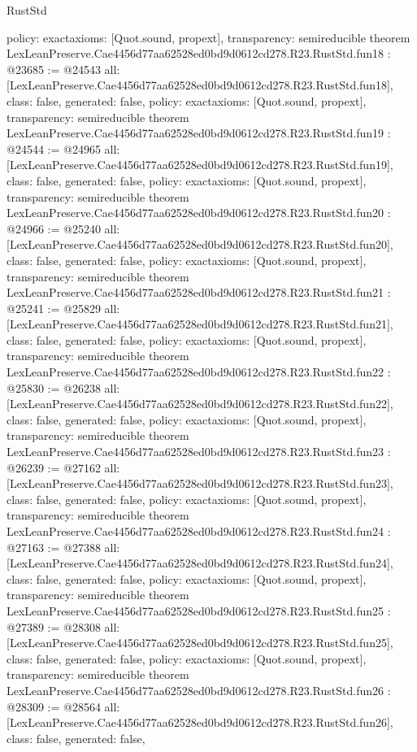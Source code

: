 \begin{lexlean}{RustStd}
\begin{coremodule}
{  policy: exact{axioms: [Quot.sound, propext]},
  transparency: semireducible
}
theorem LexLeanPreserve.Cae4456d77aa62528ed0bd9d0612cd278.R23.RustStd.fun18 : @23685 := @24543 {
  all: [LexLeanPreserve.Cae4456d77aa62528ed0bd9d0612cd278.R23.RustStd.fun18],
  class: false,
  generated: false,
  policy: exact{axioms: [Quot.sound, propext]},
  transparency: semireducible
}
theorem LexLeanPreserve.Cae4456d77aa62528ed0bd9d0612cd278.R23.RustStd.fun19 : @24544 := @24965 {
  all: [LexLeanPreserve.Cae4456d77aa62528ed0bd9d0612cd278.R23.RustStd.fun19],
  class: false,
  generated: false,
  policy: exact{axioms: [Quot.sound, propext]},
  transparency: semireducible
}
theorem LexLeanPreserve.Cae4456d77aa62528ed0bd9d0612cd278.R23.RustStd.fun20 : @24966 := @25240 {
  all: [LexLeanPreserve.Cae4456d77aa62528ed0bd9d0612cd278.R23.RustStd.fun20],
  class: false,
  generated: false,
  policy: exact{axioms: [Quot.sound, propext]},
  transparency: semireducible
}
theorem LexLeanPreserve.Cae4456d77aa62528ed0bd9d0612cd278.R23.RustStd.fun21 : @25241 := @25829 {
  all: [LexLeanPreserve.Cae4456d77aa62528ed0bd9d0612cd278.R23.RustStd.fun21],
  class: false,
  generated: false,
  policy: exact{axioms: [Quot.sound, propext]},
  transparency: semireducible
}
theorem LexLeanPreserve.Cae4456d77aa62528ed0bd9d0612cd278.R23.RustStd.fun22 : @25830 := @26238 {
  all: [LexLeanPreserve.Cae4456d77aa62528ed0bd9d0612cd278.R23.RustStd.fun22],
  class: false,
  generated: false,
  policy: exact{axioms: [Quot.sound, propext]},
  transparency: semireducible
}
theorem LexLeanPreserve.Cae4456d77aa62528ed0bd9d0612cd278.R23.RustStd.fun23 : @26239 := @27162 {
  all: [LexLeanPreserve.Cae4456d77aa62528ed0bd9d0612cd278.R23.RustStd.fun23],
  class: false,
  generated: false,
  policy: exact{axioms: [Quot.sound, propext]},
  transparency: semireducible
}
theorem LexLeanPreserve.Cae4456d77aa62528ed0bd9d0612cd278.R23.RustStd.fun24 : @27163 := @27388 {
  all: [LexLeanPreserve.Cae4456d77aa62528ed0bd9d0612cd278.R23.RustStd.fun24],
  class: false,
  generated: false,
  policy: exact{axioms: [Quot.sound, propext]},
  transparency: semireducible
}
theorem LexLeanPreserve.Cae4456d77aa62528ed0bd9d0612cd278.R23.RustStd.fun25 : @27389 := @28308 {
  all: [LexLeanPreserve.Cae4456d77aa62528ed0bd9d0612cd278.R23.RustStd.fun25],
  class: false,
  generated: false,
  policy: exact{axioms: [Quot.sound, propext]},
  transparency: semireducible
}
theorem LexLeanPreserve.Cae4456d77aa62528ed0bd9d0612cd278.R23.RustStd.fun26 : @28309 := @28564 {
  all: [LexLeanPreserve.Cae4456d77aa62528ed0bd9d0612cd278.R23.RustStd.fun26],
  class: false,
  generated: false,
}
\end{coremodule}
\end{lexlean}
